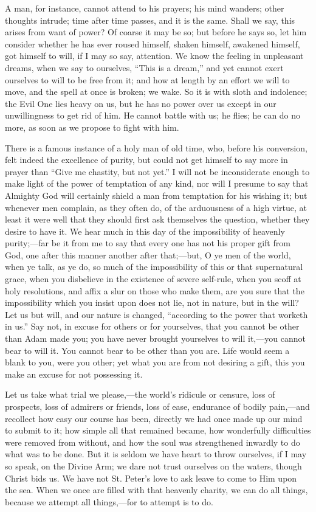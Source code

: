 A man, for instance, cannot attend to his prayers; his mind
wanders; other thoughts intrude; time after time passes, and it is the
same. Shall we say, this arises from want of power? Of coarse it may
be so; but before he says so, let him consider whether he has ever
roused himself, shaken himself, awakened himself, got himself to will,
if I may so say, attention. We know the feeling in unpleasant dreams,
when we say to ourselves, ``This is a dream,'' and yet cannot
exert ourselves to will to be free from it; and how at length by an
effort we will to move, and the spell at once is broken; we wake. So
it is with sloth and indolence; the Evil One lies heavy on us, but he
has no power over us except in our unwillingness to get rid of him. He
cannot battle with us; he flies; he can do no more, as soon as we
propose to fight with him.

There is a famous instance of a holy man of old time, who, before
his conversion, felt indeed the excellence of purity, but could not
get himself to say more in prayer than ``Give me chastity, but not
yet.'' I will not be inconsiderate enough to make light of the
power of temptation of any kind, nor will I presume to say that
Almighty God will certainly shield a man from temptation for his
wishing it; but whenever men complain, as they often do, of the
arduousness of a high virtue, at least it were well that they should
first ask themselves the question, whether they desire to have it. We
hear much in this day of the impossibility of heavenly purity;—far
be it from me to say that every one has not his proper gift from God,
one after this manner another after that;—but, O ye men of the
world, when ye talk, as ye do, so much of the impossibility of this or
that supernatural grace, when you disbelieve in the existence of
severe self-rule, when you scoff at holy resolutions, and affix a slur
on those who make them, are you sure that the impossibility which you
insist upon does not lie, not in nature, but in the will? Let us but
will, and our nature is changed, ``according to the power that
worketh in us.'' Say not, in excuse for others or for yourselves,
that you cannot be other than Adam made you; you have never brought
yourselves to will it,—you cannot bear to will it. You cannot bear
to be other than you are. Life would seem a blank to you, were you
other; yet what you are from not desiring a gift, this you make an
excuse for not possessing it.

Let us take what trial we please,—the world's ridicule or
censure, loss of prospects, loss of admirers or friends, loss of ease,
endurance of bodily pain,—and recollect how easy our course has
been, directly we had once made up our mind to submit to it; how
simple all that remained became, how wonderfully difficulties were
removed from without, and how the soul was strengthened inwardly to do
what was to be done. But it is seldom we have heart to throw
ourselves, if I may so speak, on the Divine Arm; we dare not trust
ourselves on the waters, though Christ bids us. We have not St.
Peter's love to ask leave to come to Him upon the sea. When we once
are filled with that heavenly charity, we can do all things, because
we attempt all things,—for to attempt is to do.

